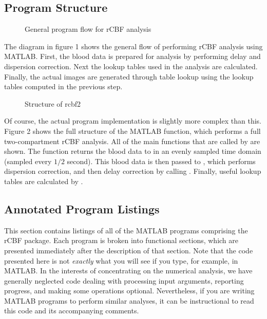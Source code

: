 \subsection{Program Structure}

\begin{figure}
\centerline{}
\caption{General program flow for rCBF analysis}
\end{figure}

The diagram in figure 1 shows the general flow of performing rCBF
analysis using MATLAB.  First, the blood data is prepared for
analysis by performing delay and dispersion correction.  Next the
lookup tables used in the analysis are calculated.  Finally, the
actual images are generated through table lookup using the lookup
tables computed in the previous step.

\begin{figure}
\centerline{}
\caption{Structure of rcbf2}
\end{figure}

Of course, the actual program implementation is slightly more complex
than this.  Figure 2 shows the full structure of the 
MATLAB function, which performs a full two-compartment rCBF analysis.
All of the main functions that are called by  are shown.
The  function returns the blood data to
 in an evenly sampled time domain (sampled every $1/2$
second).  This blood data is then passed to ,
which performs dispersion correction, and then delay correction by
calling .  Finally, useful lookup tables are
calculated by .

\subsection{Annotated Program Listings}

This section contains listings of all of the MATLAB programs
comprising the rCBF package.  Each program is broken into functional
sections, which are presented immediately after the description of
that section.  Note that the code presented here is not {\em exactly}
what you will see if you type, for example,  in
MATLAB.  In the interests of concentrating on the numerical analysis,
we have generally neglected code dealing with processing input
arguments, reporting progress, and making some operations optional.
Nevertheless, if you are writing MATLAB programs to perform similar
analyses, it can be instructional to read this code and its
accompanying comments.

